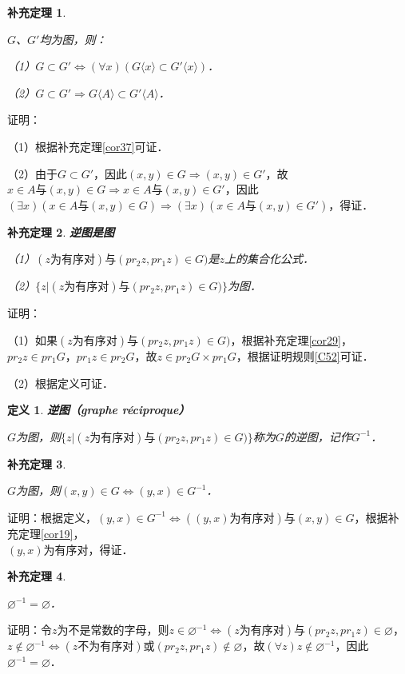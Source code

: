 \documentclass[12pt, a4paper, oneside]{book}
\newtheorem{cor}{补充定理}
\newtheorem{de}{定义}
\begin{document}
			\begin{cor}\label{cor38}
				\hfill\par
				$G$、$G'$均为图，则：
				\par
				（1）$G\subset G'\Leftrightarrow (\forall x)(G\langle x \rangle \subset G'\langle x \rangle )$．
				\par
				（2）$G\subset G'\Rightarrow G\langle A \rangle \subset G'\langle A \rangle $．
			\end{cor}
			证明：
			\par
			（1）根据补充定理\ref{cor37}可证．
			\par
			（2）由于$G\subset G'$，因此$(x, y)\in G\Rightarrow (x, y)\in G'$，故$x\in A\text{与}(x, y)\in G\Rightarrow x\in A\text{与}(x, y)\in G'$，因此$(\exists x)(x\in A\text{与}(x, y)\in G)\Rightarrow (\exists x)(x\in A\text{与}(x, y)\in G')$，得证．			

			\begin{cor}\label{cor39}
				\textbf{逆图是图}
				\par
				（1）$(z\text{为有序对})\text{与}(pr_2z, pr_1z)\in G)$是$z$上的集合化公式．
				\par
				（2）$\{z|(z\text{为有序对})\text{与}(pr_2z, pr_1z)\in G)\}$为图．
			\end{cor}
			证明：
			\par
			（1）如果$(z\text{为有序对})\text{与}(pr_2z, pr_1z)\in G)$，根据补充定理\ref{cor29}，$pr_2z\in pr_1G$，$pr_1z\in pr_2G$，故$z\in pr_2G\times pr_1G$，根据证明规则\ref{C52}可证．
			\par
			（2）根据定义可证．

			\begin{de}
				\textbf{逆图（graphe réciproque）}
				\par
				$G$为图，则$\{z|(z\text{为有序对})\text{与}(pr_2z, pr_1z)\in G)\}$称为$G$的逆图，记作$G^{-1}$．
			\end{de}

			\begin{cor}\label{cor40}
				\hfill\par
				$G$为图，则$(x, y)\in G\Leftrightarrow (y, x)\in G^{-1}$．				
			\end{cor}
			证明：根据定义，$(y, x)\in G^{-1}\Leftrightarrow ((y, x)\text{为有序对})\text{与}(x, y)\in G$，根据补充定理\ref{cor19}，\\$(y, x)\text{为有序对}$，得证．
			
			\begin{cor}\label{cor41}
				\hfill\par
				$\varnothing^{-1}=\varnothing$．
			\end{cor}
			证明：令$z$为不是常数的字母，则$z\in \varnothing^{-1}\Leftrightarrow (z\text{为有序对})\text{与}(pr_2z, pr_1z)\in \varnothing$，$z\notin \varnothing^{-1}\Leftrightarrow (z不\text{为有序对})\text{或}(pr_2z, pr_1z)\notin \varnothing$，故$(\forall z)z\notin \varnothing^{-1}$，因此$\varnothing^{-1}=\varnothing$．			
			
\end{document}
